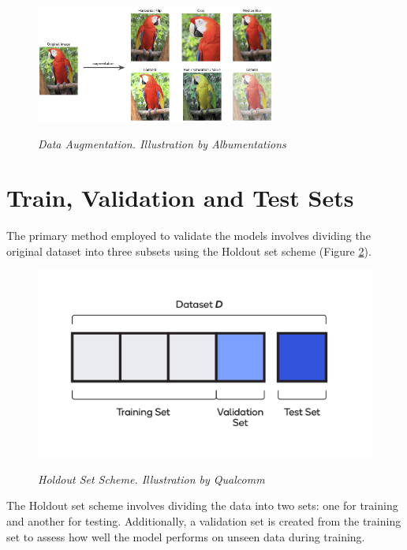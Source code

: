 \begin{figure}[H]
  \centering
  \includegraphics[width=0.7\textwidth]{imatges/preliminaries/augmentation.jpg}
  \caption[Data Augmentation]{\textit{Data Augmentation. Illustration by Albumentations}}
  {\label{fig:augmentation}}
\end{figure}


\section{Train, Validation and Test Sets}

The primary method employed to validate the models involves dividing the
original dataset into three subsets using the Holdout set scheme (Figure
\ref{fig:holdout-test-scheme}).

\begin{figure}[H]
  \centering
  \begin{adjustbox}{width=0.8\textwidth, trim={0cm 0.5cm 0cm 0.5cm}, clip}
    \includegraphics[width=\textwidth]{imatges/preliminaries/train-test-validation-sets.png}
  \end{adjustbox}
  \caption[Holdout Set Scheme]{\textit{Holdout Set Scheme. Illustration by Qualcomm}}
  {\label{fig:holdout-test-scheme}}
\end{figure}

The Holdout set scheme involves dividing the data into two sets: one for
training and another for testing. Additionally, a validation set is created
from the training set to assess how well the model performs on unseen data
during training. \\

